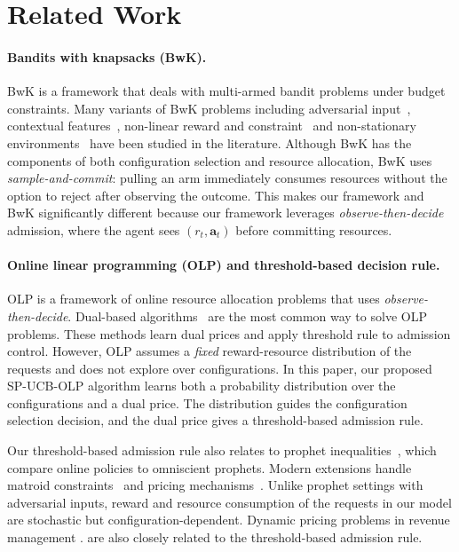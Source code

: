 \documentclass[11pt]{article}
\newcommand{\ba}{\mathbf{a}}
\begin{document}
\section{Related Work}
\label{sec:related}

\paragraph{Bandits with knapsacks (BwK).}
BwK \citep{badanidiyuru2018bandits} is a framework that deals with multi-armed bandit problems under budget constraints. Many variants of BwK problems including adversarial input~\citep{immorlica2019adversarial}, contextual features~\citep{agrawal2016linear,agrawal2016contextual}, non-linear reward and constraint~\citep{agrawal2019bandits} and non-stationary environments~\citep{liu2022nonstationary} have been studied in the literature. Although BwK has the components of both configuration selection and resource allocation, BwK uses \emph{sample-and-commit}: pulling an arm immediately consumes resources without the option to reject after observing the outcome. This makes our framework and BwK significantly different because our framework leverages \emph{observe-then-decide} admission, where the agent sees $(r_t, \ba_t)$ before committing resources.

\paragraph{Online linear programming (OLP) and threshold-based decision rule.}
OLP \citep{Agrawal2014} is a framework of online resource allocation problems that uses \emph{observe-then-decide}. Dual-based algorithms~\citep{buchbinder2009online,devanur2009adwords,agrawal2014fast,balseiro2020dual,li2022online,bray2024logarithmic} are the most common way to solve OLP problems. These methods learn dual prices and apply threshold rule to admission control. However, OLP assumes a \emph{fixed} reward-resource distribution of the requests and does not explore over configurations. In this paper, our proposed SP-UCB-OLP algorithm learns both a probability distribution over the configurations and a dual price. The distribution guides the configuration selection decision, and the dual price gives a threshold-based admission rule.

\quad Our threshold-based admission rule also relates to prophet inequalities~\citep{krengel1977semiamarts,samuel1984comparison}, which compare online policies to omniscient prophets. Modern extensions handle matroid constraints~\citep{kleinberg2012matroid} and pricing mechanisms~\citep{dutting2017prophet}. Unlike prophet settings with adversarial inputs, reward and resource consumption of the requests in our model are stochastic but configuration-dependent. Dynamic pricing problems in revenue management \citep{gallego1994optimal,talluri2004theory,besbes2012blind}.  are also closely related to the threshold-based admission rule.
\end{document}
